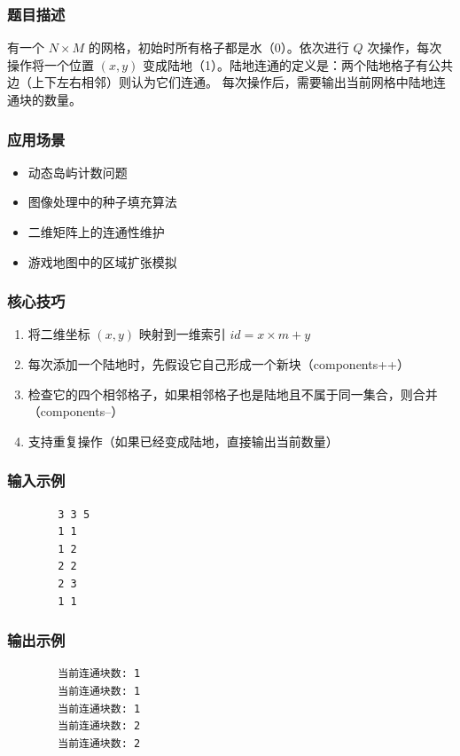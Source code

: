 \documentclass[12pt,a4paper]{ctexart}
\begin{document}
	\subsubsection*{题目描述}
	有一个 $N \times M$ 的网格，初始时所有格子都是水（0）。依次进行 $Q$ 次操作，每次操作将一个位置 $(x, y)$ 变成陆地（1）。陆地连通的定义是：两个陆地格子有公共边（上下左右相邻）则认为它们连通。  
	每次操作后，需要输出当前网格中陆地连通块的数量。
	
	\subsubsection*{应用场景}
	\begin{itemize}
		\item 动态岛屿计数问题
		\item 图像处理中的种子填充算法
		\item 二维矩阵上的连通性维护
		\item 游戏地图中的区域扩张模拟
	\end{itemize}
	
	\subsubsection*{核心技巧}
	\begin{enumerate}
		\item 将二维坐标 $(x, y)$ 映射到一维索引 $id = x \times m + y$
		\item 每次添加一个陆地时，先假设它自己形成一个新块（components++）
		\item 检查它的四个相邻格子，如果相邻格子也是陆地且不属于同一集合，则合并（components--）
		\item 支持重复操作（如果已经变成陆地，直接输出当前数量）
	\end{enumerate}
	
	\subsubsection*{输入示例}
	\begin{verbatim}
		3 3 5
		1 1
		1 2
		2 2
		2 3
		1 1
	\end{verbatim}
	
	\subsubsection*{输出示例}
	\begin{verbatim}
		当前连通块数: 1
		当前连通块数: 1
		当前连通块数: 1
		当前连通块数: 2
		当前连通块数: 2
	\end{verbatim}
	
\end{document}
